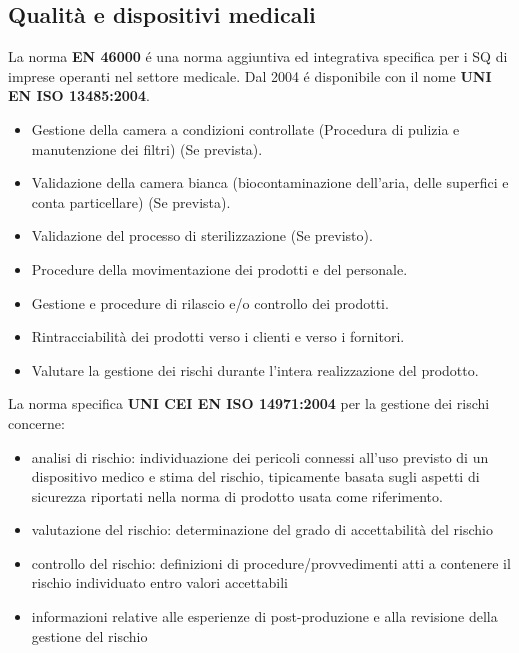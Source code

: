 \documentclass[a4paper]{article}
\begin{document}
\subsection{Qualità e dispositivi medicali}
La norma \textbf{EN 46000} é una norma aggiuntiva ed integrativa specifica per i SQ di 
imprese operanti nel settore medicale. Dal 2004 é disponibile con il nome \textbf{UNI 
EN ISO 13485:2004}.\newline
\begin{itemize}
    \item Gestione della camera a condizioni controllate (Procedura di pulizia e manutenzione dei filtri) (Se
    prevista).
    \item Validazione della camera bianca (biocontaminazione dell'aria, delle superfici e conta particellare) (Se
    prevista).
    \item Validazione del processo di sterilizzazione (Se previsto). 
    \item Procedure della movimentazione dei prodotti e del personale.
    \item Gestione e procedure di rilascio e/o controllo dei prodotti.
    \item Rintracciabilità dei prodotti verso i clienti e verso i fornitori.
    \item Valutare la gestione dei rischi durante l'intera realizzazione del prodotto. 
\end{itemize}
La norma specifica \textbf{UNI CEI EN ISO 14971:2004} per la gestione dei rischi concerne:
\begin{itemize}
    \item analisi di rischio: individuazione dei pericoli connessi all’uso previsto di un dispositivo medico e stima del
    rischio, tipicamente basata sugli aspetti di sicurezza riportati nella norma di prodotto usata come
    riferimento.
    \item valutazione del rischio: determinazione del grado di accettabilità del rischio
    \item controllo del rischio: definizioni di procedure/provvedimenti atti a contenere il rischio individuato entro
    valori accettabili
    \item informazioni relative alle esperienze di post-produzione e alla revisione della gestione del rischio 
\end{itemize}
\end{document}
